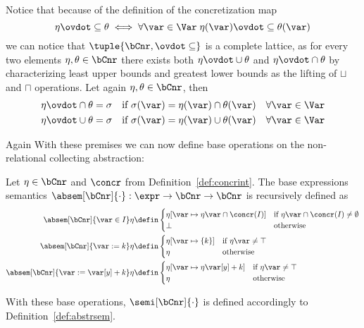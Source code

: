 Notice that because of the definition of the concretization map
\begin{equation*}
  \eta \ovdot\subseteq \theta \iff \forall \var \in \Var \; \eta(\var) \ovdot\subseteq \theta(\var)
\end{equation*}
we can notice that \(\tuple{\bCnr, \ovdot\subseteq}\) is a complete
lattice, as for every two elements \(\eta,\theta\in\bCnr\) there
exists both \(\eta \ovdot\cup \theta\) and \(\eta \ovdot\cap \theta\)
by characterizing least upper bounds and greatest lower bounds as the
lifting of \(\sqcup\) and \(\sqcap\) operations. Let again
\(\eta, \theta \in \bCnr\), then
\begin{align*}
  \eta \ovdot\cap \theta = \sigma & \quad \text{if } \sigma(\var) = \eta(\var) \cap \theta(\var) \quad \forall \var\in\Var \\
  \eta \ovdot\cup \theta = \sigma & \quad \text{if } \sigma(\var) = \eta(\var) \cup \theta(\var) \quad \forall \var\in\Var
\end{align*}

Again With these premises we can now define base
operations on the non-relational collecting abstraction:
\begin{definition}
  Let \(\eta \in \bCnr\) and \(\concr\) from
  Definition~\ref{def:concrint}. The base expressions semantics
  \(\absem[\bCnr]{\cdot} : \expr \to \bCnr \to \bCnr\) is recursively
  defined as
  \begin{align*}
    \absem[\bCnr]{\var\in I}\eta & \defin
                                   \begin{cases}
                                     \eta[\var\mapsto\eta\var\cap \concr(I)] & \text{if } \eta\var\cap \concr(I) \neq \emptyset \\
                                     \bot & \text{otherwise}
                                   \end{cases} \\
    \absem[\bCnr]{\var := k}\eta & \defin
                                   \begin{cases}
                                     \eta[\var\mapsto\{k\}] & \text{if } \eta\var\neq\top \\
                                     \eta & \text{otherwise}
                                   \end{cases} \\
    \absem[\bCnr]{\var := \var[y] + k}\eta & \defin
                                             \begin{cases}
                                               \eta[\var\mapsto\eta\var[y] + k] & \text{if } \eta\var\neq\top \\
                                               \eta & \text{otherwise}
                                             \end{cases}
  \end{align*}
\end{definition}
With these base operations, \(\semi[\bCnr]{\cdot}\) is defined
accordingly to Definition~\ref{def:abstrsem}.

